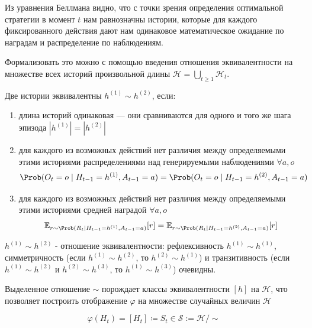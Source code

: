 \documentclass[../main.tex]{subfiles}
\begin{document}
Из уравнения Беллмана видно, что с точки зрения определения оптимальной стратегии в момент $t$ нам равнозначны истории, которые для каждого фиксированного действия дают нам одинаковое математическое ожидание по наградам и распределение по наблюдениям.

Формализовать это можно с помощью введения отношения эквивалентности на множестве всех историй произвольной длины 
${\mathcal{H} = \bigcup_{t \geq 1} \mathcal{H}_t}$. 

\begin{definition}
Две истории эквивалентны $h^{(1)} \sim h^{(2)}$, если:
\begin{enumerate}
	\item  длина историй одинаковая --- они сравниваются для одного и того же шага эпизода $|h^{(1)}|=|h^{(2)}|$
	\item для каждого из возможных действий нет различия между определяемыми этими историями распределениями над генерируемыми наблюдениями $\forall a,o$ $$\Prob(O_t=o \mid H_{t-1}=h^{(1)}, A_{t-1}=a)=\Prob(O_t=o \mid H_{t-1}=h^{(2)}, A_{t-1}=a)$$ 
	\item для каждого из возможных действий нет различия между определяемыми этими историями средней наградой $\forall a,o$
	$$\E_{r \sim \Prob(R_t \mid H_{t-1}=h^{(1)}, A_{t-1}=a)} [r] = \E_{r \sim \Prob(R_t \mid H_{t-1}=h^{(2)}, A_{t-1}=a)} [r] $$
\end{enumerate}
\end{definition}

$h^{(1)} \sim h^{(2)}$ - отношение эквивалентности:
рефлексивность $h^{(1)} \sim h^{(1)}$, симметричность (если $h^{(1)} \sim h^{(2)}$, то $h^{(2)} \sim h^{(1)}$)  и
транзитивность (если $h^{(1)} \sim h^{(2)}$ и $h^{(2)} \sim h^{(3)}$, то $h^{(1)} \sim h^{(3)}$) очевидны.

Выделенное отношение $\sim$ порождает классы эквивалентности $[h]$ на $\mathcal{H}$, что позволяет построить отображение $\varphi$ на множестве случайных величин $\mathcal{H}$

 $$\varphi(H_t)=[H_t] \coloneqq S_t \in \mathcal{S}:=\mathcal{H} / \sim$$ 
 
\end{document}
